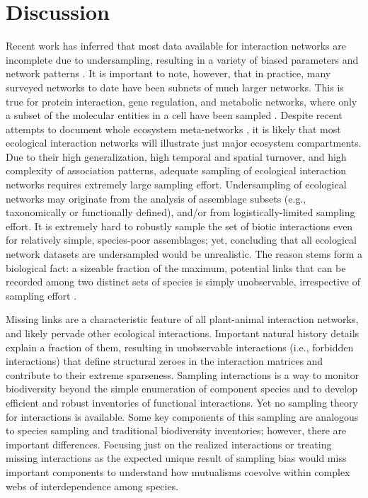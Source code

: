 \documentclass[12pt]{article}
\begin{document}
\section*{Discussion}
\label{discussion}
Recent work has inferred that most data available for interaction networks are incomplete due to undersampling, resulting in a variety of biased parameters and network patterns \citep{Chacoff:2012}. It is important to note, however, that in practice, many surveyed networks to date have been subnets of much larger networks. This is true for protein interaction, gene regulation, and metabolic networks, where only a subset of the molecular entities in a cell have been sampled \citep{Stumpf:2005tn}. Despite recent attempts to document whole ecosystem meta-networks \citep{Pocock:2012ep}, it is likely that most ecological interaction networks will illustrate just major ecosystem compartments. Due to their high generalization, high temporal and spatial turnover, and high complexity of association patterns, adequate sampling of ecological interaction networks requires extremely large sampling effort. Undersampling of ecological networks may originate from the analysis of assemblage subsets (e.g., taxonomically or functionally defined), and\slash or from logistically-limited sampling effort. It is extremely hard to robustly sample the set of biotic interactions even for relatively simple, species-poor assemblages; yet, concluding that all ecological network datasets are undersampled would be unrealistic. The reason stems form a biological fact: a sizeable fraction of the maximum, potential links that can be recorded among two distinct sets of species is simply unobservable, irrespective of sampling effort \citep{E31/2562}. 

Missing links are a characteristic feature of all plant-animal interaction networks, and likely pervade other ecological interactions. Important natural history details explain a fraction of them, resulting in unobservable interactions (i.e., forbidden interactions) that define structural zeroes in the interaction matrices and contribute to their extreme sparseness. Sampling interactions is a way to monitor biodiversity beyond the simple enumeration of component species and to develop efficient and robust inventories of functional interactions. Yet no sampling theory for interactions is available. Some key components of this sampling are analogous to species sampling and traditional biodiversity inventories; however, there are important differences. Focusing just on the realized interactions or treating missing interactions as the expected unique result of sampling bias would miss important components to understand how mutualisms coevolve within complex webs of interdependence among species. 
\end{document}
